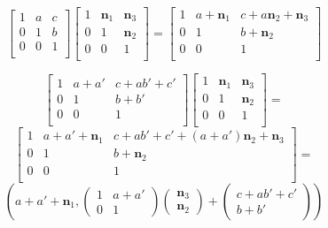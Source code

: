 \documentclass[12pt,twoside,a4paper]{report}
\begin{document}
 \begin{equation}
 {\begin{bmatrix}1&a&c\\0&1&b\\0&0&1\\\end{bmatrix}}
 {\begin{bmatrix}1&\mathbf{n}_1&\mathbf{n}_3\\0&1&\mathbf{n}_2\\0&0&1\\\end{bmatrix}}={\begin{bmatrix}1&a+\mathbf{n}_1&c+a\mathbf{n}_2+\mathbf{n}_3\\0&1&b+\mathbf{n}_2\\0&0&1\\\end{bmatrix}}
  \end{equation}
  
  \begin{equation}
  {\begin{bmatrix}1&a+a'&c+ab'+c'\\0&1&b+b'\\0&0&1\\\end{bmatrix}}
   {\begin{bmatrix}1&\mathbf{n}_1&\mathbf{n}_3\\0&1&\mathbf{n}_2\\0&0&1\\\end{bmatrix}}=
   \end{equation}
   \[
  {\begin{bmatrix}1&a+a'+\mathbf{n}_1&c+ab'+c'+(a+a')\mathbf{n}_2+\mathbf{n}_3\\0&1&b+\mathbf{n}_2\\0&0&1\\\end{bmatrix}}=
  \]
  \[
  \left(a+a'+\mathbf{n}_1,\begin{pmatrix}1&a+a'\\0&1\end{pmatrix}\begin{pmatrix}\mathbf{n}_3\\\mathbf{n}_2\end{pmatrix}+\begin{pmatrix}c+ab'+c'\\b+b'\end{pmatrix}\right)
  \]
 
\end{document}
